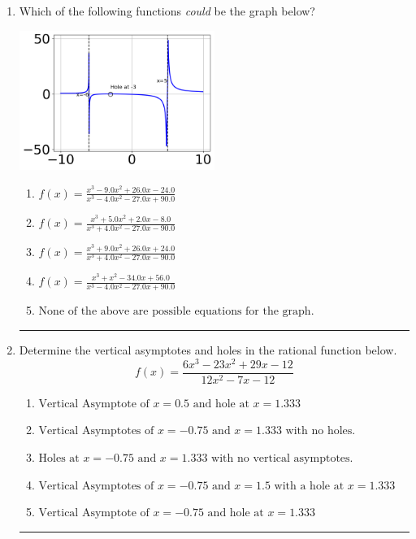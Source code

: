 \documentclass[14pt]{extbook}
\newcommand{\litem}[1]{\item#1\hspace*{-1cm}\rule{\textwidth}{0.4pt}}
\begin{document}
\begin{enumerate}
{\begin{enumerate}[label=\Alph*.]
\end{enumerate} }
\litem{
Which of the following functions \textit{could} be the graph below?
\begin{center}
    \includegraphics[width=0.5\textwidth]{../Figures/identifyGraphOfRationalFunctionC.png}
\end{center}
\begin{enumerate}[label=\Alph*.]
\item \( f(x)=\frac{x^{3} -9.0 x^{2} +26.0 x -24.0}{x^{3} -4.0 x^{2} -27.0 x + 90.0} \)
\item \( f(x)=\frac{x^{3} +5.0 x^{2} +2.0 x -8.0}{x^{3} +4.0 x^{2} -27.0 x -90.0} \)
\item \( f(x)=\frac{x^{3} +9.0 x^{2} +26.0 x + 24.0}{x^{3} +4.0 x^{2} -27.0 x -90.0} \)
\item \( f(x)=\frac{x^{3} + x^{2} -34.0 x + 56.0}{x^{3} -4.0 x^{2} -27.0 x + 90.0} \)
\item \( \text{None of the above are possible equations for the graph.} \)

\end{enumerate} }
\litem{
Determine the vertical asymptotes and holes in the rational function below.\[ f(x) = \frac{6x^{3} -23 x^{2} +29 x -12}{12x^{2} -7 x -12} \]\begin{enumerate}[label=\Alph*.]
\item \( \text{Vertical Asymptote of } x = 0.5 \text{ and hole at } x = 1.333 \)
\item \( \text{Vertical Asymptotes of } x = -0.75 \text{ and } x = 1.333 \text{ with no holes.} \)
\item \( \text{Holes at } x = -0.75 \text{ and } x = 1.333 \text{ with no vertical asymptotes.} \)
\item \( \text{Vertical Asymptotes of } x = -0.75 \text{ and } x = 1.5 \text{ with a hole at } x = 1.333 \)
\item \( \text{Vertical Asymptote of } x = -0.75 \text{ and hole at } x = 1.333 \)


\end{enumerate}}
\end{enumerate}
\end{document}
